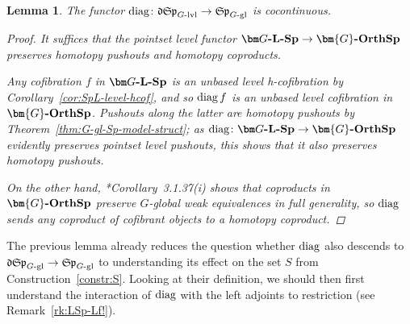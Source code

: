 \documentclass[reqno]{memo-l}
\theoremstyle{mythm}
\newtheorem{lemma}[thm]{Lemma}
\theoremstyle{definition}
\numberwithin{equation}{section}
\newcommand{\cat}[1]{\textbf{\textup{#1}}}
\newcommand{\diag}{\textup{diag}}
\newcommand{\mySp}{{\mathfrak S\kern-.5pt\mathfrak p}}
\newcommand{\myLSp}{{\mathfrak d\kern-.25pt}\mySp}
\newcommand{\Gosp}[1]{\cat{$\bm{#1}$-OrthSp}}
\begin{document}
\begin{lemma}\label{lemma:delta*-cc}
    The functor $\diag\colon \myLSp_\textup{$G$-lvl}\to{\mySp}_\textup{$G$-gl}$ is cocontinuous.
    \begin{proof}
        It suffices that the pointset level functor $\cat{$\bm G$-$\cat{L}$-Sp}\to\Gosp{G}$ preserves homotopy pushouts and homotopy coproducts.

        Any cofibration $f$ in $\cat{$\bm G$-$\cat{L}$-Sp}$ is an unbased level h-cofibration by Corollary~\ref{cor:SpL-level-hcof}, and so $\diag\,f$ is an unbased level cofibration in $\Gosp{G}$. Pushouts along the latter are homotopy pushouts by Theorem~\ref{thm:G-gl-Sp-model-struct}; as $\diag\colon\cat{$\bm G$-$\cat{L}$-Sp}\to\Gosp{G}$ evidently preserves pointset level pushouts, this shows that it also preserves homotopy pushouts.
        
        On the other hand, \cite{schwede2018global}*{Corollary~3.1.37(i)} shows that coproducts in $\Gosp{G}$ preserve $G$-global weak equivalences in full generality, so $\diag$ sends any coproduct of cofibrant objects to a homotopy coproduct.
    \end{proof}
\end{lemma}

The previous lemma already reduces the question whether $\diag$ also descends to $\myLSp_\text{$G$-gl}\to\mySp_\text{$G$-gl}$ to understanding its effect on the set $S$ from Construction~\ref{constr:S}. Looking at their definition, we should then first understand the interaction of $\diag$ with the left adjoints to restriction (see Remark~\ref{rk:LSp-Lf!}).
\end{document}
